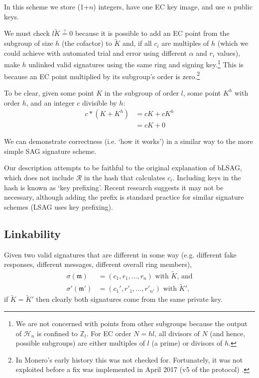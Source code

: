 In this scheme we store (1+$n$) integers, have one EC key image, and use $n$ public keys.

We must check $l \tilde{K} \stackrel{?}{=} 0$ because it is possible to add an EC point from the subgroup of size $h$ (the cofactor) to $\tilde{K}$ and, if all $c_i$ are multiples of $h$ (which we could achieve with automated trial and error using different $\alpha$ and $r_i$ values), make $h$ unlinked valid signatures using the same ring and signing key.\footnote{We are not concerned with points from other subgroups because the output of $\mathcal{H}_n$ is confined to $\mathbb{Z}_l$. For EC order $N = h l$, all divisors of $N$ (and hence, possible subgroups) are either multiples of $l$ (a prime) or divisors of $h$.} This is because an EC point multiplied by its subgroup's order is zero.\footnote{In Monero's early history this was not checked for. Fortunately, it was not exploited before a fix was implemented in April 2017 (v5 of the protocol) \cite{key-image-bug}.}

To be clear, given some point $K$ in the subgroup of order $l$, some point $K^h$ with order $h$, and an integer $c$ divisible by $h$:
\begin{align*}
    c*(K + K^h) &= cK + cK^h\\
                &= cK + 0
\end{align*}

We can demonstrate correctness (i.e. `how it works') in a similar way to the more simple SAG signature scheme.

Our description attempts to be faithful to the original explanation of bLSAG, which does not include $\mathcal{R}$ in the hash that calculates $c_i$. Including keys in the hash is known as `key prefixing'. Recent research \cite{key-prefix-paper} suggests it may not be necessary, although adding the prefix is standard practice for similar signature schemes (LSAG uses key prefixing).


\subsection*{Linkability}

Given two valid signatures that are different in some way (e.g. different fake responses, different messages, different overall ring members),\vspace{.1cm}
\begin{align*}
	\sigma(\mathfrak{m})   &= (c_1, r_1, ..., r_n)\textrm{ with } \tilde{K}\textrm{, and}\\
	\sigma'(\mathfrak{m}')  &= (c_1', r'_1, ..., r'_{n'})\textrm{ with } \tilde{K}'\textrm{,}
\end{align*}
\quad if \(\tilde{K} =  \tilde{K}'\) then clearly both signatures come from the same private key.%

